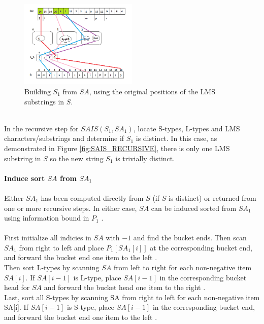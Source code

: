 \documentclass[12pt]{article} %
\begin{document}
\\
\begin{figure}[H]
    \centering
    \includegraphics[width=0.5\textwidth]{SAIS_LMSS}
    \captionsetup{width=0.8\textwidth}
    \caption{Building $S_1$ from $SA$, using the original positions of the LMS substrings in $S$.}
    \label{fig:SAIS_LMSS}
    
\end{figure}
\\
In the recursive step for $SAIS(S_1, SA_1)$, locate S-types, L-types and LMS characters/substrings and determine if $S_1$ is distinct. In this case, as demonstrated in Figure  \ref{fig:SAIS_RECURSIVE}, there is only one LMS substring in $S$ so the new string $S_1$ is trivially distinct.
\\ \\
\textbf{Induce sort $SA$ from $SA_{1}$}
\\ \\
Either $SA_{1}$ has been computed directly from $S$ (if $S$ is distinct) or returned from one or more recursive steps. In either case, $SA$ can be induced sorted from $SA_1$ using information bound in $P_1$ \cite{twoeffecient}. 
\\ \\
First initialize all indicies in $SA$ with $-1$ and find the bucket ends. Then scan $SA_1$ from right to left and place $P_1[SA_1[i]]$ at the corresponding bucket end, and forward the bucket end one item to the left \cite{twoeffecient}. 
 \\
Then sort L-types by scanning $SA$ from left to right for each non-negative item $SA[i]$. If  $SA[i-1]$ is L-type, place $SA[i-1]$ in the corresponding bucket head for $SA$ and forward the bucket head one item to the right \cite{twoeffecient}.
\\
Last, sort all S-types by scanning SA from right to left for each non-negative item SA[i]. If  $SA[i-1]$ is S-type, place $SA[i-1]$ in the corresponding bucket end, and forward the bucket end one item to the left \cite{twoeffecient}. 
\\
\end{document}
